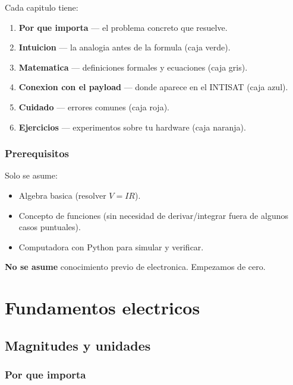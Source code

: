 \documentclass[11pt,a4paper,oneside,openright]{book}
\begin{document}
Cada capitulo tiene:
\begin{enumerate}[label=\arabic*., leftmargin=2em]
  \item \textbf{Por que importa} --- el problema concreto que resuelve.
  \item \textbf{Intuicion} --- la analogia antes de la formula (caja verde).
  \item \textbf{Matematica} --- definiciones formales y ecuaciones (caja gris).
  \item \textbf{Conexion con el payload} --- donde aparece en el INTISAT
        (caja azul).
  \item \textbf{Cuidado} --- errores comunes (caja roja).
  \item \textbf{Ejercicios} --- experimentos sobre tu hardware (caja naranja).
\end{enumerate}

\section*{Prerequisitos}

Solo se asume:
\begin{itemize}[leftmargin=2em]
  \item Algebra basica (resolver $V = I R$).
  \item Concepto de funciones (sin necesidad de derivar/integrar fuera de
        algunos casos puntuales).
  \item Computadora con Python para simular y verificar.
\end{itemize}

\textbf{No se asume} conocimiento previo de electronica. Empezamos de cero.

\tableofcontents

\mainmatter

\part{Fundamentos electricos}

\chapter{Magnitudes y unidades}

\section{Por que importa}
\end{document}
